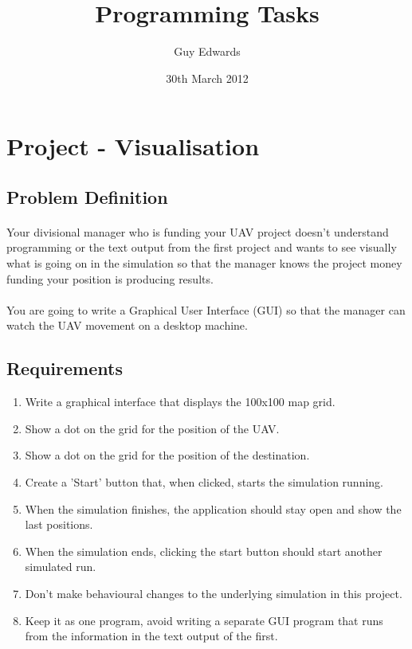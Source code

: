 \documentclass[11pt]{book}
\title{\textbf{Programming Tasks}}
\author{Guy Edwards}
\date{30th March 2012}
\begin{document}
\section{Project - Visualisation}

\subsection{Problem Definition}

\paragraph{} Your divisional manager who is funding your UAV project doesn't understand programming or the text output from the first project and wants to see visually what is going on in the simulation so that the manager knows the project money funding your position is producing results.

\paragraph{} You are going to write a Graphical User Interface (GUI) so that the manager can watch the UAV movement on a desktop machine.

\subsection{Requirements}

\begin{enumerate}
\item Write a graphical interface that displays the 100x100 map grid.
\item Show a dot on the grid for the position of the UAV.
\item Show a dot on the grid for the position of the destination.
\item Create a 'Start' button that, when clicked, starts the simulation running.
\item When the simulation finishes, the application should stay open and show the last positions.
\item When the simulation ends, clicking the start button should start another simulated run.
\item Don't make behavioural changes to the underlying simulation in this project.
\item Keep it as one program, avoid writing a separate GUI program that runs from the information in the text output of the first.
\end{enumerate}
\end{document}
